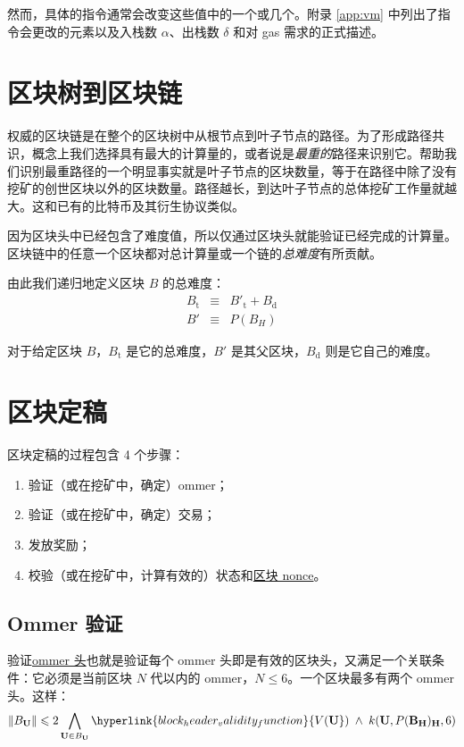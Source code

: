 \documentclass[9pt,oneside]{amsart}
\begin{document}
\begin{multicols}{2}
然而，具体的指令通常会改变这些值中的一个或几个。附录 \ref{app:vm} 中列出了指令会更改的元素以及入栈数 $\alpha$、出栈数 $\delta$ 和对 gas 需求的正式描述。

\section{区块树到区块链} \label{ch:ghost}

权威的区块链是在整个的区块树中从根节点到叶子节点的路径。为了形成路径共识，概念上我们选择具有最大的计算量的，或者说是\textit{最重的}路径来识别它。帮助我们识别最重路径的一个明显事实就是叶子节点的区块数量，等于在路径中除了没有挖矿的创世区块以外的区块数量。路径越长，到达叶子节点的总体挖矿工作量就越大。这和已有的比特币及其衍生协议类似。

因为区块头中已经包含了难度值，所以仅通过区块头就能验证已经完成的计算量。区块链中的任意一个区块都对总计算量或一个链的\textit{总难度}有所贡献。

由此我们递归地定义区块 $B$ 的总难度：
\begin{eqnarray}
B_{\mathrm{t}} & \equiv & B'_{\mathrm{t}} + B_{\mathrm{d}} \\
B' & \equiv & P(B_{H})
\end{eqnarray}

对于给定区块 $B$，$B_{\mathrm{t}}$ 是它的总难度，$B'$ 是其父区块，$B_{\mathrm{d}}$ 则是它自己的难度。

\section{区块定稿} \label{ch:finalisation}

区块定稿的过程包含 4 个步骤：

\begin{enumerate}
\item 验证（或在挖矿中，确定）ommer；
\item 验证（或在挖矿中，确定）交易；
\item 发放奖励；
\item 校验（或在挖矿中，计算有效的）状态和\hyperlink{block_nonce}{区块 nonce}。
\end{enumerate}

\subsection{Ommer 验证}

验证\hyperlink{ommer_block_headers_B__U}{ommer 头}也就是验证每个 ommer 头即是有效的区块头，又满足一个关联条件：它必须是当前区块 $N$ 代以内的 ommer，$N \leq 6$。一个区块最多有两个 ommer 头。这样：
\begin{equation}
\lVert B_{\mathbf{U}} \rVert \leqslant 2 \bigwedge_{\mathbf{U} \in B_{\mathbf{U}}} \hyperlink{block_header_validity_function}{V({\mathbf{U}}})\; \wedge \; k({\mathbf{U}}, P(\mathbf{B}_{\mathbf{H}})_{\mathbf{H}}, 6)
\end{equation}


\end{multicols}
\end{document}
